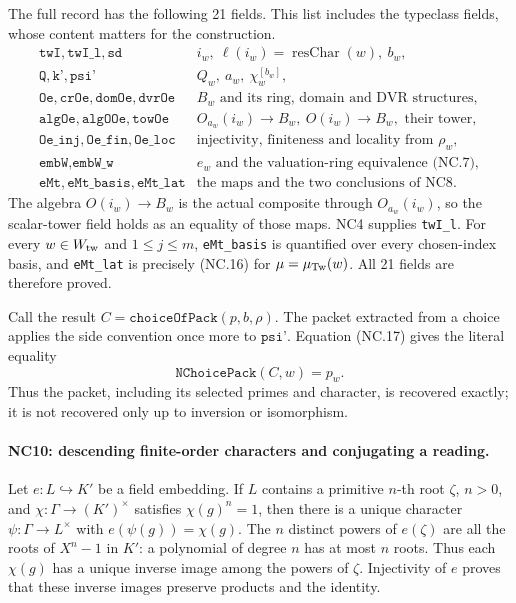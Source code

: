 The full record has the following 21 fields. This list includes
the typeclass fields, whose content matters for the construction.
\[
\begin{array}{ll}
 \texttt{twI},\texttt{twI\_l},\texttt{sd}
     & i_w,\ \ell(i_w)=\operatorname{resChar}(w),\ b_w,\\
 \texttt{Q},\texttt{k'},\texttt{psi'}
     & Q_w,\ a_w,\ \chi_w^{[b_w]},\\
 \texttt{Oe},\texttt{crOe},\texttt{domOe},\texttt{dvrOe}
     & B_w\text{ and its ring, domain and DVR structures},\\
 \texttt{algOe},\texttt{algOOe},\texttt{towOe}
     & O_{a_w}(i_w)\to B_w,\ O(i_w)\to B_w,\text{ their tower},\\
 \texttt{Oe\_inj},\texttt{Oe\_fin},\texttt{Oe\_loc}
     & \text{injectivity, finiteness and locality from }\rho_w,\\
 \texttt{embW},\texttt{embW\_w}
     & e_w\text{ and the valuation-ring equivalence (NC.7)},\\
 \texttt{eMt},\texttt{eMt\_basis},\texttt{eMt\_lat}
     & \text{the maps and the two conclusions of NC8}.
\end{array}
\tag{NC.20}
\]
The algebra \(O(i_w)\to B_w\) is the actual composite through
\(O_{a_w}(i_w)\), so the scalar-tower field holds as an equality
of those maps. NC4 supplies \texttt{twI\_l}.
For every \(w\in W_{\rm tw}\) and \(1\leq j\leq m\),
\texttt{eMt\_basis} is quantified over every chosen-index basis,
and \texttt{eMt\_lat} is precisely (NC.16) for
\(\mu=\mu_{\rm Tw}(w)\). All 21 fields are therefore proved.

Call the result \(C=\texttt{choiceOfPack}(p,b,\rho)\).
The packet extracted from a choice applies the side convention
once more to \(\texttt{psi'}\). Equation (NC.17) gives the
literal equality
\[
 \texttt{NChoicePack}(C,w)=p_w.
 \tag{NC.21}
\]
Thus the packet, including its selected primes and character,
is recovered exactly; it is not recovered only up to inversion
or isomorphism.

\paragraph{NC10: descending finite-order characters and conjugating a reading.}
Let \(e:L\hookrightarrow K'\) be a field embedding.
If \(L\) contains a primitive \(n\)-th root \(\zeta\), \(n>0\),
and \(\chi:\Gamma\to(K')^\times\) satisfies \(\chi(g)^n=1\),
then there is a unique character \(\psi:\Gamma\to L^\times\)
with \(e(\psi(g))=\chi(g)\).
The \(n\) distinct powers of \(e(\zeta)\) are all the roots of
\(X^n-1\) in \(K'\): a polynomial of degree \(n\) has at most
\(n\) roots. Thus each \(\chi(g)\) has a unique inverse image
among the powers of \(\zeta\).
Injectivity of \(e\) proves that these inverse images preserve
products and the identity.

